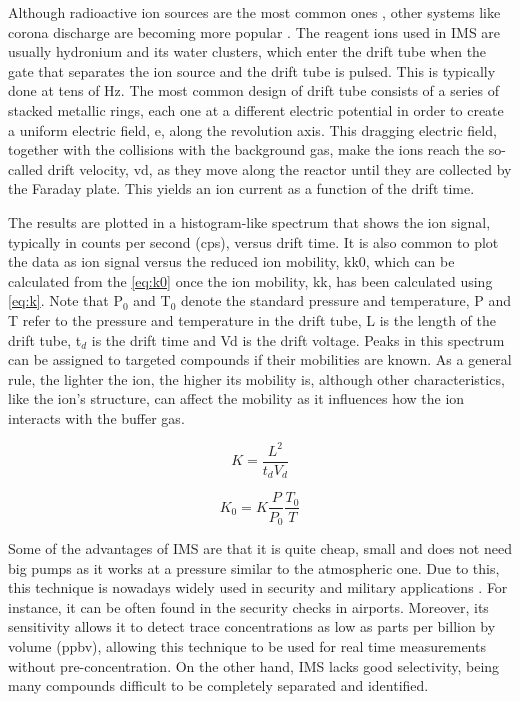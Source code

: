 Although radioactive ion sources are the most common ones \cite{GonzalezMendez2017939}, other systems like corona discharge are becoming more popular \cite{michalczuk2019isomer}. The reagent ions used in IMS are usually hydronium and its water clusters, which enter the drift tube when the gate that separates the ion source and the drift tube is pulsed. This is typically done at tens of Hz. The most common design of drift tube consists of a series of stacked metallic rings, each one at a different electric potential in order to create a uniform electric field, \acrshort{e}, along the revolution axis. This dragging electric field, together with the collisions with the background gas, make the ions reach the so-called drift velocity, \acrshort{vd}, as they move along the reactor until they are collected by the Faraday plate. This yields an ion current as a function of the drift time.

The results are plotted in a histogram-like spectrum that shows the ion signal, typically in counts per second (\acrshort{cps}), versus drift time. It is also common to plot the data as ion signal versus the reduced ion mobility, \acrshort{kk0}, which can be calculated from the  \autoref{eq:k0} once the ion mobility, \acrshort{kk}, has been calculated using \autoref{eq:k}. Note that P$_0$ and T$_0$ denote the standard   pressure and temperature,
P and T refer to the pressure and temperature in the drift tube,
L is the length of the drift tube, t$_d$ is the drift time and \acrshort{Vd} is the drift voltage.
Peaks in this spectrum can be assigned to targeted compounds if their mobilities are known. As a general rule, the lighter the ion, the higher its mobility is, although other characteristics, like the ion's structure, can affect the mobility as it influences how the ion interacts with the buffer gas.


\begin{equation}
K = \frac{L^2}{t_d V_d}
\label{eq:k}
\end{equation}

\begin{equation}
K_0 = K\frac{P}{P_0}\frac{T_0}{T}
\label{eq:k0}
\end{equation}





Some of the advantages of IMS are that it is quite cheap, small and does not need big pumps as it works at a pressure similar to the atmospheric one. Due to this, this technique is nowadays widely used in security and military applications \cite{borsdorf2006ion}. For instance, it can be often found in the security checks in airports. Moreover, its sensitivity allows it to detect trace concentrations as low as parts per billion by volume (\acrshort{ppbv}), allowing this technique to be used for real time measurements without pre-concentration. On the other hand, IMS lacks good selectivity, being many compounds difficult to be completely separated and identified.

